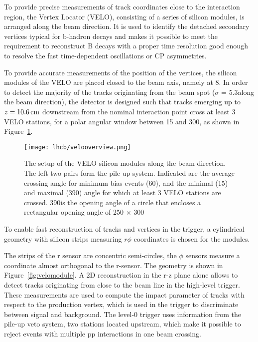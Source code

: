 To provide precise measurements of track coordinates close to the interaction 
region, the Vertex Locator (VELO), consisting of a series of silicon modules, 
is arranged along the beam direction. It is used to identify the detached 
secondary vertices typical for b-hadron decays and makes it possible to meet 
the requirement to reconstruct B decays
with a proper time resolution good enough to resolve the fast time-dependent
oscillations or CP asymmetries.

To provide accurate measurements of the position of the vertices, the silicon
modules of the VELO are placed closed to the beam axis, namely at 8\mm.
In order to detect the majority of the tracks originating
from the beam spot ($\sigma$ = 5.3\cm along the beam direction), 
the detector is designed such that
tracks emerging up to $z = 10.6\rm \,cm$ downstream from the nominal interaction
point cross at least 3 VELO stations, for a polar angular window between 15
and 300\mrad, as shown in Figure~\ref{fig:velooverview}.

\begin{figure}[tb]
\begin{center}
\texttt{[image: lhcb/velooverview.png]}
\end{center}
\caption{\small The setup of the VELO silicon modules along the beam direction.
The left two pairs form the pile-up system. Indicated are the average crossing
angle for minimum bias events (60\mrad), and the minimal (15\mrad) and
maximal (390\mrad) angle for which at least 3 VELO stations are crossed.
390\mrad is the opening angle of a circle that encloses a rectangular opening
angle of 250 $\times$ 300\mrad}
\label{fig:velooverview}
\end{figure}

To enable fast reconstruction of tracks and vertices in the \lhcb trigger,
a cylindrical geometry with silicon strips measuring $r\phi$ coordinates is
chosen for the modules.

The strips of the r sensor are concentric semi-circles, the $\phi$ sensors 
measure a coordinate almost orthogonal to the r-sensor. The geometry is shown in
Figure~\ref{fig:velomodule}. A 2D reconstruction in the r-z plane alone allows to
detect tracks originating from close to the beam line in the high-level trigger.
These measurements are used to compute the impact parameter of tracks with
respect to the production vertex, which is used in the trigger to discriminate 
between signal and background. The level-0 trigger uses information from the
pile-up veto system, two stations located upstream, which make it possible to
reject events with multiple pp interactions in one beam crossing.

